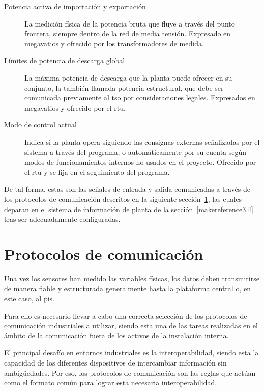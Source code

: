 \begin{description}
  \item[Potencia activa de importación y exportación] La medición física de la potencia bruta que fluye a través del punto frontera, siempre dentro de la red de media tensión. Expresado en megavatios y ofrecido por los transformadores de medida.

  \item[Límites de potencia de descarga global] La máxima potencia de descarga que la planta puede ofrecer en su conjunto, la también llamada potencia estructural, que debe ser comunicada previamente al \gls{tso} por consideraciones legales. Expresados en megavatios y ofrecido por el \gls{rtu}.

  \item[Modo de control actual] Indica si la planta opera siguiendo las consignas externas señalizadas por el sistema a través del programa, o automáticamente por su cuenta según modos de funcionamientos internos no usados en el proyecto. Ofrecido por el \gls{rtu} y se fija en el seguimiento del programa.

\end{description}

De tal forma, estas son las señales de entrada y salida comunicadas a través de los protocolos de comunicación descritos en la siguiente sección~\ref{makereference3.3}, las cuales deparan en el sistema de información de planta de la sección~\ref{makereference3.4} tras ser adecuadamente configuradas.

\section{Protocolos de comunicación}
\label{makereference3.3}

Una vez los sensores han medido las variables físicas, los datos deben transmitirse de manera fiable y estructurada generalmente hasta la plataforma central o, en este caso, al \gls{pis}.

Para ello es necesario llevar a cabo una correcta selección de los protocolos de comunicación industriales a utilizar, siendo esta una de las tareas realizadas en el ámbito de la comunicación fuera de los activos de la instalación interna.

El principal desafío en entornos industriales es la interoperabilidad, siendo esta la capacidad de los diferentes dispositivos de intercambiar información sin ambigüedades. Por eso, los protocolos de comunicación son las reglas que actúan como el formato común para lograr esta necesaria interoperabilidad.

